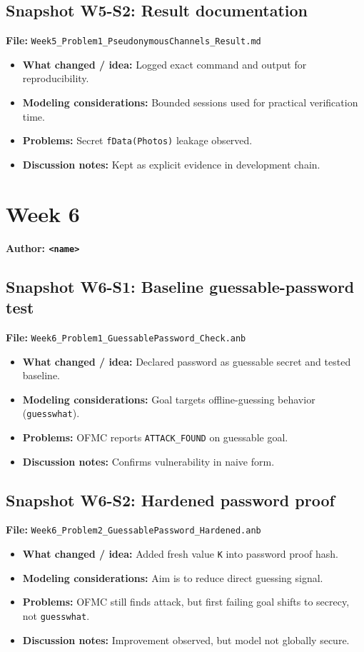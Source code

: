 \documentclass[11pt,a4paper]{article}
\begin{document}
\subsection*{Snapshot W5-S2: Result documentation}
\textbf{File:} \texttt{Week5\_Problem1\_PseudonymousChannels\_Result.md}
\begin{itemize}[leftmargin=1.2em]
  \item \textbf{What changed / idea:} Logged exact command and output for reproducibility.
  \item \textbf{Modeling considerations:} Bounded sessions used for practical verification time.
  \item \textbf{Problems:} Secret \texttt{fData(Photos)} leakage observed.
  \item \textbf{Discussion notes:} Kept as explicit evidence in development chain.
\end{itemize}

\section{Week 6}
\textbf{Author: \texttt{<name>}}

\subsection*{Snapshot W6-S1: Baseline guessable-password test}
\textbf{File:} \texttt{Week6\_Problem1\_GuessablePassword\_Check.anb}
\begin{itemize}[leftmargin=1.2em]
  \item \textbf{What changed / idea:} Declared password as guessable secret and tested baseline.
  \item \textbf{Modeling considerations:} Goal targets offline-guessing behavior (\texttt{guesswhat}).
  \item \textbf{Problems:} OFMC reports \texttt{ATTACK\_FOUND} on guessable goal.
  \item \textbf{Discussion notes:} Confirms vulnerability in naive form.
\end{itemize}

\subsection*{Snapshot W6-S2: Hardened password proof}
\textbf{File:} \texttt{Week6\_Problem2\_GuessablePassword\_Hardened.anb}
\begin{itemize}[leftmargin=1.2em]
  \item \textbf{What changed / idea:} Added fresh value \texttt{K} into password proof hash.
  \item \textbf{Modeling considerations:} Aim is to reduce direct guessing signal.
  \item \textbf{Problems:} OFMC still finds attack, but first failing goal shifts to secrecy, not \texttt{guesswhat}.
  \item \textbf{Discussion notes:} Improvement observed, but model not globally secure.
\end{itemize}
\end{document}
